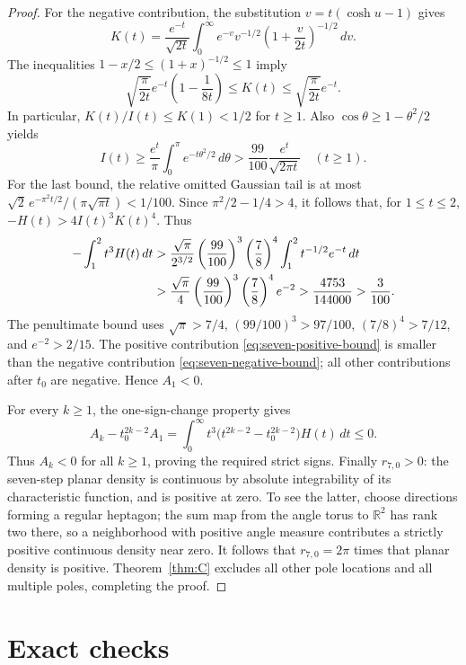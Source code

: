 \documentclass[11pt]{amsart}
\theoremstyle{definition}
\begin{document}
\begin{proof}
For the negative contribution, the substitution $v=t(\cosh u-1)$
gives
\[
 K(t)=\frac{e^{-t}}{\sqrt{2t}}
      \int_0^\infty e^{-v}v^{-1/2}
                 \left(1+\frac v{2t}\right)^{-1/2}\,dv.
\]
The inequalities $1-x/2\le(1+x)^{-1/2}\le1$ imply
\begin{equation}\label{eq:seven-K-bounds}
 \sqrt{\frac\pi{2t}}e^{-t}\left(1-\frac1{8t}\right)
 \le K(t)\le\sqrt{\frac\pi{2t}}e^{-t}.
\end{equation}
In particular, $K(t)/I(t)\le K(1)<1/2$ for $t\ge1$.
Also $\cos\theta\ge1-\theta^2/2$ yields
\[
 I(t)\ge\frac{e^t}{\pi}\int_0^\pi e^{-t\theta^2/2}\,d\theta
 >\frac{99}{100}\frac{e^t}{\sqrt{2\pi t}}\quad(t\ge1).
\]
For the last bound, the relative omitted Gaussian tail is at most
$\sqrt2\,e^{-\pi^2t/2}/(\pi\sqrt{\pi t})<1/100$.
Since $\pi^2/2-1/4>4$, it follows that, for $1\le t\le2$,
$-H(t)>4I(t)^3K(t)^4$. Thus
\begin{align}
 -\int_1^2t^3H(t)\,dt
 &>\frac{\sqrt\pi}{2^{3/2}}
       \left(\frac{99}{100}\right)^3\left(\frac78\right)^4
       \int_1^2t^{-1/2}e^{-t}\,dt\notag\\
 &>\frac{\sqrt\pi}{4}
       \left(\frac{99}{100}\right)^3\left(\frac78\right)^4e^{-2}
 >\frac{4753}{144000}>\frac3{100}.
 \label{eq:seven-negative-bound}
\end{align}
The penultimate bound uses
$\sqrt\pi>7/4$, $(99/100)^3>97/100$,
$(7/8)^4>7/12$, and $e^{-2}>2/15$.
The positive contribution \eqref{eq:seven-positive-bound} is smaller
than the negative contribution \eqref{eq:seven-negative-bound}; all
other contributions after $t_0$ are negative. Hence $A_1<0$.

For every $k\ge1$, the one-sign-change property gives
\[
 A_k-t_0^{2k-2}A_1
 =\int_0^\infty t^3\bigl(t^{2k-2}-t_0^{2k-2}\bigr)H(t)\,dt\le0.
\]
Thus $A_k<0$ for all $k\ge1$, proving the required strict signs.
Finally $r_{7,0}>0$: the seven-step planar density is continuous by
absolute integrability of its characteristic function, and is positive
at zero. To see the latter, choose directions forming a regular
heptagon; the sum map from the angle torus to $\mathbb R^2$ has rank
two there, so a neighborhood with positive angle measure contributes a
strictly positive continuous density near zero. It follows that
$r_{7,0}=2\pi$ times that planar density is positive.
Theorem~\ref{thm:C} excludes all other pole locations and all multiple
poles, completing the proof.
\end{proof}

\section{Exact checks}\label{sec:comp}
\end{document}
